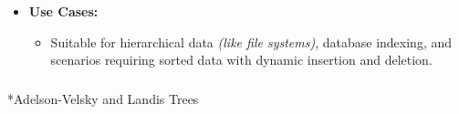 \documentclass[
  letterpaper,
  DIV=11,
  numbers=noendperiod]{scrreprt}
\makeatletter
\let\oldsubparagraph\subparagraph
\renewcommand{\subparagraph}{
    \@ifstar
      \xxxSubParagraphStar
      \xxxSubParagraphNoStar
  }
\newcommand{\xxxSubParagraphStar}[1]{\oldsubparagraph*{#1}\mbox{}}
\newcommand{\xxxSubParagraphNoStar}[1]{\oldsubparagraph{#1}\mbox{}}
\providecommand{\tightlist}{%
  \setlength{\itemsep}{0pt}\setlength{\parskip}{0pt}}
\makeatother
\begin{document}
\begin{tcolorbox}[enhanced jigsaw, colframe=quarto-callout-note-color-frame, toprule=.15mm, bottomrule=.15mm, rightrule=.15mm, colback=white, breakable, arc=.35mm, opacityback=0, left=2mm, leftrule=.75mm]
\begin{itemize}
\item
  \textbf{Use Cases:}

  \begin{itemize}
  \tightlist
  \item
    Suitable for hierarchical data \emph{(like file systems)}, database
    indexing, and scenarios requiring sorted data with dynamic insertion
    and deletion.
  \end{itemize}
\end{itemize}

\end{tcolorbox}

\subparagraph*{Adelson-Velsky and Landis
Trees}\label{adelson-velsky-and-landis-trees}
\end{document}
